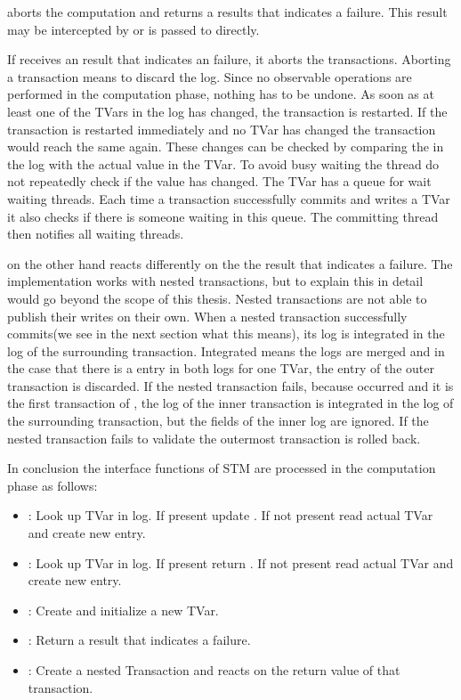  aborts the computation and returns a results that indicates a failure. This result may be intercepted by 
 or is passed to  directly. 

If  receives an result that indicates an failure, it aborts the transactions. 
Aborting a transaction means to discard the log. Since no observable operations are performed in the computation phase, nothing has to be undone. 
As soon as at least one of the TVars in the log has changed, the transaction is restarted. If the transaction is restarted immediately and no 
TVar has changed the transaction would reach the same  again. These changes can be checked by comparing the  in
the log with the actual value in the TVar. To avoid busy waiting the thread do not repeatedly check if the value has changed. The TVar has a 
queue for wait waiting threads. Each time a transaction successfully commits and writes a TVar it also checks if there is someone waiting in 
this queue. The committing thread then notifies all waiting threads.

 on the other hand reacts differently on the the result that indicates a failure. The implementation works with nested transactions, 
but to explain this in detail would go beyond the scope of this thesis. Nested transactions are not able to publish their writes on their own.
When a nested transaction successfully commits(we see in the next section what this means), its log is integrated in the log of the surrounding transaction. 
Integrated means the logs are merged and in the case that there is a entry in both logs for one TVar, the entry of the outer transaction is discarded.
If the nested transaction fails, because  occurred and it is the first transaction of , the log of the inner transaction
is integrated in the log of the surrounding transaction, but the  fields of the inner log are ignored. If the nested transaction
fails to validate the outermost transaction is rolled back.

In conclusion the interface functions of STM are processed in the computation phase as follows:
\begin{itemize}
 \item {}: Look up TVar in log. If present update . If not present read actual TVar and create new entry.
 \item {}: Look up TVar in log. If present return . If not present read actual TVar and create new entry.
 \item {}: Create and initialize a new TVar. 
 \item {}: Return a result that indicates a failure.
 \item {}: Create a nested Transaction and reacts on the return value of that transaction.
\end{itemize}


